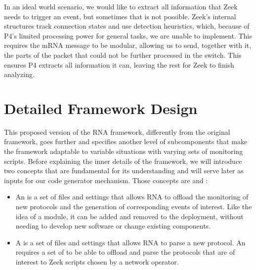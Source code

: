In an ideal world scenario, we would like to extract all information that Zeek needs to trigger an event, but sometimes that is not possible. Zeek's internal structures track connection states and use detection heuristics, which, because of P4's limited processing power for general tasks, we are unable to implement. This requires the mRNA message to be modular, allowing us to send, together with it, the parts of the packet that could not be further processed in the switch. This ensures P4 extracts all information it can, leaving the rest for Zeek to finish analyzing.

\section{Detailed Framework Design}
\label{sec:rna:detailed_design}

This proposed version of the RNA framework, differently from the original framework, goes further and specifies another level of subcomponents that make the framework adaptable to variable situations with varying sets of monitoring scripts. Before explaining the inner details of the framework, we will introduce two concepts that are fundamental for its understanding and will serve later as inputs for our code generator mechanism. Those concepts are \Offloader{} and \ProtocolTemplate{}:

\begin{itemize}
    \item An \textit{\Offloader{}} is a set of files and settings that allows RNA to offload the monitoring of new protocols and the generation of corresponding events of interest. Like the idea of a module, it can be added and removed to the deployment, without needing to develop new software or change existing components.

    \item A \textit{\ProtocolTemplate{}} is a set of files and settings that allows RNA to parse a new protocol. An \Offloader{} requires a set of \ProtocolTemplates{} to be able to offload and parse the protocols that are of interest to Zeek scripts chosen by a network operator.
\end{itemize}

